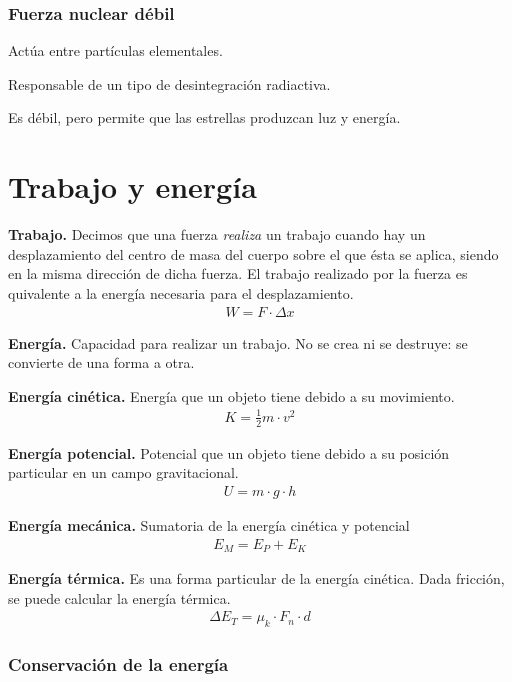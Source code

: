 \documentclass[12pt]{article}
\begin{document}
\subsubsection{Fuerza nuclear débil}

Actúa entre partículas elementales.

Responsable de un tipo de desintegración radiactiva.

Es débil, pero permite que las estrellas produzcan luz y energía.

\section{Trabajo y energía}

\textbf{Trabajo.} 
Decimos que una fuerza \textit{realiza} un trabajo
cuando hay un desplazamiento del centro de masa del cuerpo
sobre el que ésta se aplica,
siendo en la misma dirección de dicha fuerza.
El trabajo realizado por la fuerza es quivalente a la energía necesaria 
para el desplazamiento.
\begin{align*}
  W = F \cdot \Delta x
\end{align*}

\textbf{Energía.} 
Capacidad para realizar un trabajo. 
No se crea ni se destruye: se convierte de una forma a otra.

\textbf{Energía cinética.}
Energía que un objeto tiene debido a su movimiento.
\begin{align*}
  K = \frac{1}{2}m\cdot v^{2}
\end{align*}

\textbf{Energía potencial.}
Potencial que un objeto tiene debido a su posición particular en un campo gravitacional.
\begin{align*}
  U = m\cdot g\cdot h
\end{align*}

\textbf{Energía mecánica.}
Sumatoria de la energía cinética y potencial
\begin{align*}
  E_{M} = E_{P} + E_{K}
\end{align*}

\textbf{Energía térmica.}
Es una forma particular de la energía cinética.
Dada fricción, se puede calcular la energía térmica.
\begin{align*}
  \Delta E_{T} = \mu_{k}\cdot F_{n}\cdot d
\end{align*}

\subsubsection{Conservación de la energía}
\end{document}
